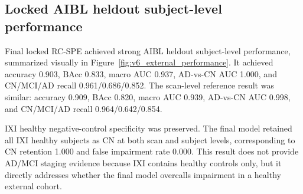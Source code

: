 \documentclass[12pt,a4paper]{article}
\begin{document}
\subsection{Locked AIBL heldout subject-level performance}
\label{sec:external_results}

Final locked RC-SPE achieved strong AIBL heldout subject-level performance, summarized visually in Figure~\ref{fig:v6_external_performance}. It achieved accuracy 0.903, BAcc 0.833, macro AUC 0.937, AD-vs-CN AUC 1.000, and CN/MCI/AD recall 0.961/0.686/0.852. The scan-level reference result was similar: accuracy 0.909, BAcc 0.820, macro AUC 0.939, AD-vs-CN AUC 0.998, and CN/MCI/AD recall 0.964/0.642/0.854.

IXI healthy negative-control specificity was preserved. The final model retained all IXI healthy subjects as CN at both scan and subject levels, corresponding to CN retention 1.000 and false impairment rate 0.000. This result does not provide AD/MCI staging evidence because IXI contains healthy controls only, but it directly addresses whether the final model overcalls impairment in a healthy external cohort.
\end{document}
